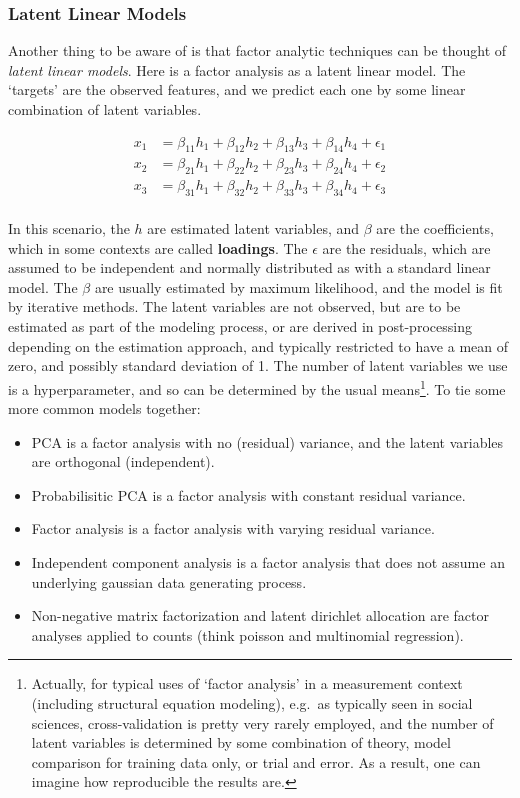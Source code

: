 \documentclass[
  letterpaper,
]{krantz}
\providecommand{\tightlist}{%
  \setlength{\itemsep}{0pt}\setlength{\parskip}{0pt}}\usepackage{longtable,booktabs,array}
\begin{document}
\subsubsection{Latent Linear Models}\label{latent-linear-models}

Another thing to be aware of is that factor analytic techniques can be
thought of \emph{latent linear models}. Here is a factor analysis as a
latent linear model. The `targets' are the observed features, and we
predict each one by some linear combination of latent variables.

\[
\begin{aligned}
x_1 &= \beta_{11} h_1 + \beta_{12} h_2 + \beta_{13} h_3 + \beta_{14} h_4 + \epsilon_1 \\
x_2 &= \beta_{21} h_1 + \beta_{22} h_2 + \beta_{23} h_3 + \beta_{24} h_4 + \epsilon_2 \\
x_3 &= \beta_{31} h_1 + \beta_{32} h_2 + \beta_{33} h_3 + \beta_{34} h_4 + \epsilon_3 \\
\end{aligned}
\]

In this scenario, the \(h\) are estimated latent variables, and
\(\beta\) are the coefficients, which in some contexts are called
\textbf{loadings}. The \(\epsilon\) are the residuals, which are assumed
to be independent and normally distributed as with a standard linear
model. The \(\beta\) are usually estimated by maximum likelihood, and
the model is fit by iterative methods. The latent variables are not
observed, but are to be estimated as part of the modeling process, or
are derived in post-processing depending on the estimation approach, and
typically restricted to have a mean of zero, and possibly standard
deviation of 1. The number of latent variables we use is a
hyperparameter, and so can be determined by the usual means\footnote{Actually,
  for typical uses of `factor analysis' in a measurement context
  (including structural equation modeling), e.g.~as typically seen in
  social sciences, cross-validation is pretty very rarely employed, and
  the number of latent variables is determined by some combination of
  theory, model comparison for training data only, or trial and error.
  As a result, one can imagine how reproducible the results are.}. To
tie some more common models together:

\begin{itemize}
\tightlist
\item
  PCA is a factor analysis with no (residual) variance, and the latent
  variables are orthogonal (independent).
\item
  Probabilisitic PCA is a factor analysis with constant residual
  variance.
\item
  Factor analysis is a factor analysis with varying residual variance.
\item
  Independent component analysis is a factor analysis that does not
  assume an underlying gaussian data generating process.
\item
  Non-negative matrix factorization and latent dirichlet allocation are
  factor analyses applied to counts (think poisson and multinomial
  regression).
\end{itemize}
\end{document}
